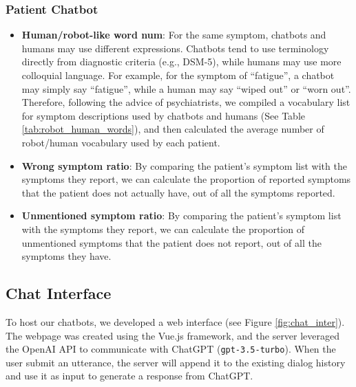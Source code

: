 \subsubsection{Patient Chatbot}
\begin{itemize}
    \item \textbf{Human/robot-like word num}: For the same symptom, chatbots and humans may use different expressions. Chatbots tend to use terminology directly from diagnostic criteria (e.g., DSM-5), while humans may use more colloquial language. For example, for the symptom of ``fatigue'', a chatbot may simply say ``fatigue'', while a human may say ``wiped out'' or ``worn out''. Therefore, following the advice of psychiatrists, we compiled a vocabulary list for symptom descriptions used by chatbots and humans (See Table \ref{tab:robot_human_words}), and then calculated the average number of robot/human vocabulary used by each patient.
    \item \textbf{Wrong symptom ratio}: By comparing the patient's symptom list with the symptoms they report, we can calculate the proportion of reported symptoms that the patient does not actually have, out of all the symptoms reported.
    \item \textbf{Unmentioned symptom ratio}: By comparing the patient's symptom list with the symptoms they report, we can calculate the proportion of unmentioned symptoms that the patient does not report, out of all the symptoms they have.
\end{itemize}



\subsection{Chat Interface}
\label{sec:chatInterface}
To host our chatbots, we developed a web interface (see Figure \ref{fig:chat_inter}). The webpage was created using the Vue.js framework, and the server leveraged the OpenAI API to communicate with ChatGPT (\texttt{gpt-3.5-turbo}). When the user submit an utterance, the server will append it to the existing dialog history and use it as input to generate a response from ChatGPT. 


